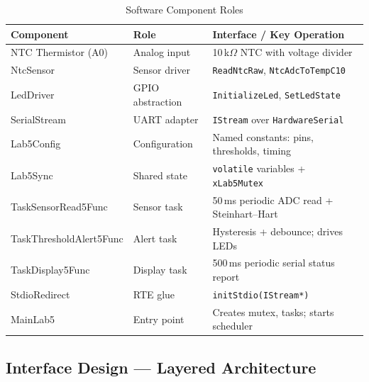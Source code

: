 \documentclass[12pt]{article}
\begin{document}
\begin{table}[H]
\centering
\begin{tabular}{@{}p{3.6cm}p{2.8cm}p{6.0cm}@{}}
\toprule
\textbf{Component} & \textbf{Role} & \textbf{Interface / Key Operation} \\
\midrule
NTC Thermistor (A0)          & Analog input      & 10\,k$\Omega$ NTC with voltage divider \\
NtcSensor                    & Sensor driver      & \texttt{ReadNtcRaw}, \texttt{NtcAdcToTempC10} \\
LedDriver                    & GPIO abstraction   & \texttt{InitializeLed}, \texttt{SetLedState} \\
SerialStream                 & UART adapter       & \texttt{IStream} over \texttt{HardwareSerial} \\
Lab5Config                   & Configuration      & Named constants: pins, thresholds, timing \\
Lab5Sync                     & Shared state       & \texttt{volatile} variables + \texttt{xLab5Mutex} \\
TaskSensorRead5Func          & Sensor task        & 50\,ms periodic ADC read + Steinhart--Hart \\
TaskThresholdAlert5Func      & Alert task         & Hysteresis + debounce; drives LEDs \\
TaskDisplay5Func             & Display task       & 500\,ms periodic serial status report \\
StdioRedirect                & RTE glue           & \texttt{initStdio(IStream*)} \\
MainLab5                     & Entry point        & Creates mutex, tasks; starts scheduler \\
\bottomrule
\end{tabular}
\caption{Software Component Roles}
\label{tab:components}
\end{table}

\subsection{Interface Design --- Layered Architecture}
\end{document}

